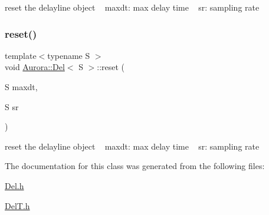 reset the delayline object ~\newline
maxdt\+: max delay time ~\newline
sr\+: sampling rate \mbox{\label{class_aurora_1_1_del_a1d5f6aa043e47077b3c1654d884c77f1}} 
\subsubsection{\texorpdfstring{reset()}{reset()}\hspace{0.1cm}{\footnotesize\ttfamily [2/2]}}
{\footnotesize\ttfamily template$<$typename S $>$ \\
void \hyperlink{class_aurora_1_1_del}{Aurora\+::\+Del}$<$ S $>$\+::reset (\begin{DoxyParamCaption}\item[{S}]{maxdt,  }\item[{S}]{sr }\end{DoxyParamCaption})\hspace{0.3cm}{\ttfamily [inline]}}

reset the delayline object ~\newline
maxdt\+: max delay time ~\newline
sr\+: sampling rate 

The documentation for this class was generated from the following files\+:\begin{DoxyCompactItemize}
\item 
\hyperlink{_del_8h}{Del.\+h}\item 
\hyperlink{_del_t_8h}{Del\+T.\+h}\end{DoxyCompactItemize}
